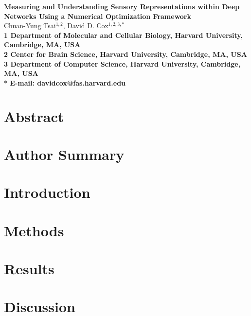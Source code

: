 \begin{flushleft}
{\Large
\textbf{Measuring and Understanding Sensory Representations within Deep Networks Using a Numerical Optimization Framework}
}
\\
Chuan-Yung Tsai$^{1,2}$, 
David D. Cox$^{1,2,3,\ast}$
\\
\bf{1} Department of Molecular and Cellular Biology, Harvard University, Cambridge, MA, USA
\\
\bf{2} Center for Brain Science, Harvard University, Cambridge, MA, USA
\\
\bf{3} Department of Computer Science, Harvard University, Cambridge, MA, USA
\\
$\ast$ E-mail: davidcox@fas.harvard.edu
\end{flushleft}

\section*{Abstract}

\section*{Author Summary}

\section*{Introduction} 
\label{sec:intro}


\section*{Methods} 
\label{sec:methods}


\section*{Results} 
\label{sec:results}


\section*{Discussion} 
\label{sec:discussion}


